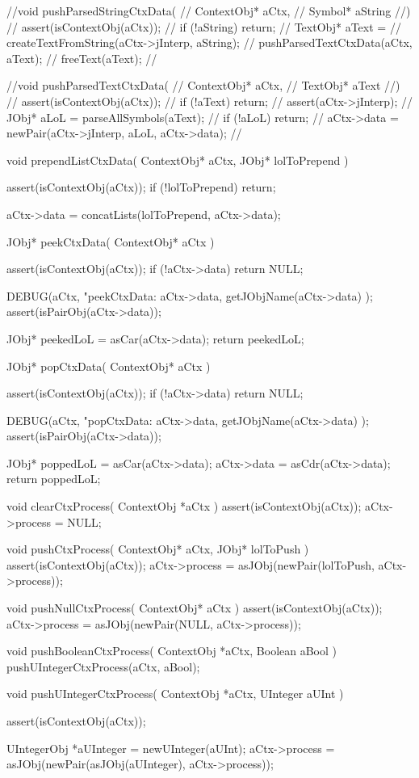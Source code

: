 //void pushParsedStringCtxData(
//  ContextObj* aCtx,
//  Symbol* aString
//) {
//  assert(isContextObj(aCtx));
//  if (!aString) return;
//  TextObj* aText =
//    createTextFromString(aCtx->jInterp, aString);
//  pushParsedTextCtxData(aCtx, aText);
//  freeText(aText);
//}

//void pushParsedTextCtxData(
//  ContextObj* aCtx,
//  TextObj* aText
//) {
//  assert(isContextObj(aCtx));
//  if (!aText) return;
//  assert(aCtx->jInterp);
//  JObj* aLoL = parseAllSymbols(aText);
//  if (!aLoL) return;
//  aCtx->data = newPair(aCtx->jInterp, aLoL, aCtx->data);
//}

void prependListCtxData(
  ContextObj* aCtx,
  JObj* lolToPrepend
) {
  assert(isContextObj(aCtx));
  if (!lolToPrepend) return;

  aCtx->data =
    concatLists(lolToPrepend, aCtx->data);
}

JObj* peekCtxData(
  ContextObj* aCtx
) {
  assert(isContextObj(aCtx));
  if (!aCtx->data) return NULL;

  DEBUG(aCtx, "peekCtxData: %
    aCtx->data, getJObjName(aCtx->data)
  );
  assert(isPairObj(aCtx->data));
 
  JObj* peekedLoL = asCar(aCtx->data);
  return peekedLoL;
}

JObj* popCtxData(
  ContextObj* aCtx
) {
  assert(isContextObj(aCtx));
  if (!aCtx->data) return NULL;

  DEBUG(aCtx, "popCtxData: %
    aCtx->data, getJObjName(aCtx->data)
  );
  assert(isPairObj(aCtx->data));
 
  JObj* poppedLoL = asCar(aCtx->data);
  aCtx->data      = asCdr(aCtx->data);
  return poppedLoL;
}

void clearCtxProcess(
  ContextObj *aCtx
) {
  assert(isContextObj(aCtx));
  aCtx->process = NULL;
}

void pushCtxProcess(
  ContextObj* aCtx,
  JObj* lolToPush
) {
  assert(isContextObj(aCtx));
  aCtx->process =
    asJObj(newPair(lolToPush, aCtx->process));
}

void pushNullCtxProcess(
  ContextObj* aCtx
) {
  assert(isContextObj(aCtx));
  aCtx->process =
    asJObj(newPair(NULL, aCtx->process));
}

void pushBooleanCtxProcess(
  ContextObj *aCtx,
  Boolean     aBool
) {
  pushUIntegerCtxProcess(aCtx, aBool);
}

void pushUIntegerCtxProcess(
  ContextObj *aCtx,
  UInteger   aUInt
) {
  assert(isContextObj(aCtx));

  UIntegerObj *aUInteger = newUInteger(aUInt);
  aCtx->process =
    asJObj(newPair(asJObj(aUInteger), aCtx->process));
}

